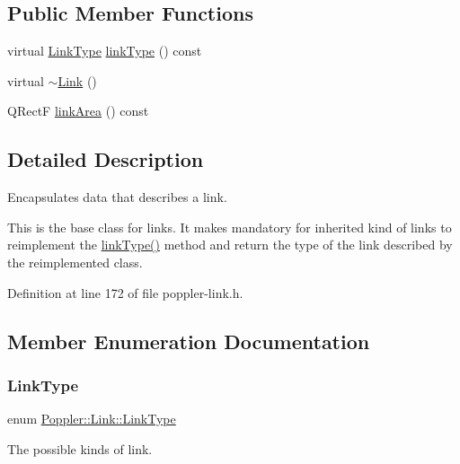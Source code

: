 \subsection*{Public Member Functions}
\begin{DoxyCompactItemize}
\item 
virtual \hyperlink{class_poppler_1_1_link_af0dacfa77a548bb043dbae4bb9dc6c1e}{Link\+Type} \hyperlink{class_poppler_1_1_link_a3e3ad7e8867e255c24b9a562bad596ed}{link\+Type} () const
\item 
virtual \hyperlink{class_poppler_1_1_link_a2e8b3b5bd61a8e3c53bb4622c5f93c2e}{$\sim$\+Link} ()
\item 
Q\+RectF \hyperlink{class_poppler_1_1_link_adb525b65cfac39dcdba3f59faa57a0bf}{link\+Area} () const
\end{DoxyCompactItemize}


\subsection{Detailed Description}
Encapsulates data that describes a link. 

This is the base class for links. It makes mandatory for inherited kind of links to reimplement the \hyperlink{class_poppler_1_1_link_a3e3ad7e8867e255c24b9a562bad596ed}{link\+Type()} method and return the type of the link described by the reimplemented class. 

Definition at line 172 of file poppler-\/link.\+h.



\subsection{Member Enumeration Documentation}
\mbox{\label{class_poppler_1_1_link_af0dacfa77a548bb043dbae4bb9dc6c1e}} 
\subsubsection{\texorpdfstring{Link\+Type}{LinkType}}
{\footnotesize\ttfamily enum \hyperlink{class_poppler_1_1_link_af0dacfa77a548bb043dbae4bb9dc6c1e}{Poppler\+::\+Link\+::\+Link\+Type}}

The possible kinds of link.


